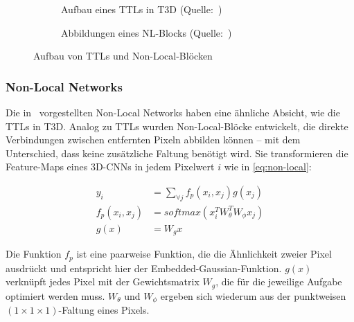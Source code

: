 \begin{figure}
    \centering
    \begin{subfigure}[b]{.45\textwidth}
        \centering
        \caption{Aufbau eines TTLs in T3D (Quelle:~\cite{Diba17})}
        \label{fig:t3d}
    \end{subfigure}%
    \hfill
    \begin{subfigure}[b]{.45\textwidth}
        \centering
        \caption{Abbildungen eines NL-Blocks (Quelle:~\cite{Wang18})}
        \label{fig:non-local}
    \end{subfigure}
    \caption{Aufbau von TTLs und Non-Local-Blöcken}
\end{figure}

\subsubsection*{Non-Local Networks}

Die in~\cite{Wang18} vorgestellten Non-Local Networks haben eine ähnliche Absicht, wie die TTLs in T3D.
Analog zu TTLs wurden Non-Local-Blöcke entwickelt, die direkte Verbindungen zwischen entfernten Pixeln abbilden können -- mit dem Unterschied, dass keine zusätzliche Faltung benötigt wird.
Sie transformieren die Feature-Maps eines 3D-CNNs in jedem Pixelwert $i$ wie in \autoref{eq:non-local}:

\begin{equation}
\label{eq:non-local}
\begin{split}
    y_i             & = \sum_{\forall j} f_p(x_i, x_j) g(x_j) \\
    f_p(x_i, x_j)   & = softmax(x_i^T W^T_\theta W_\phi x_j) \\
    g(x)            & = W_g x
\end{split}
\end{equation}

Die Funktion $f_p$ ist eine paarweise Funktion, die die Ähnlichkeit zweier Pixel ausdrückt und entspricht hier der Embedded-Gaussian-Funktion.
$g(x)$ verknüpft jedes Pixel mit der Gewichtsmatrix $W_g$, die für die jeweilige Aufgabe optimiert werden muss.
$W_\theta$ und $W_\phi$ ergeben sich wiederum aus der punktweisen $(1 \times 1 \times 1)$-Faltung eines Pixels.

